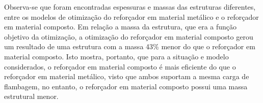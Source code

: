 Observa-se que foram encontradas espessuras e massas das estruturas diferentes, entre os modelos de otimização do reforçador em material metálico e o reforçador em material composto.
Em relação a massa da estrutura, que era a função objetivo da otimização, a otimização do reforçador em material composto gerou um resultado de uma estrutura com a massa 43\% menor do que o reforçador em material composto. Isto mostra, portanto, que para a situação e modelo considerados, o reforçador em material composto é mais eficiente do que o reforçador em material metálico, visto que ambos suportam a mesma carga de flambagem, no entanto, o reforçador em material composto possui uma massa estrutural menor.
